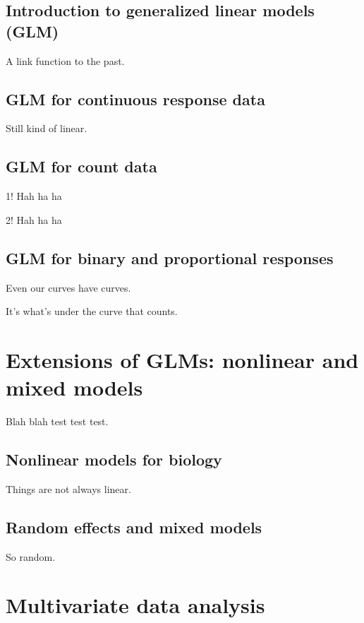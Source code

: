 \documentclass[
  13,
  letterpaper,
]{report}
\begin{document}
\chapter{Introduction to generalized linear models (GLM)}\label{sec-16}

A link function to the past.

\chapter{GLM for continuous response data}\label{sec-17}

Still kind of linear.

\chapter{GLM for count data}\label{sec-18}

1! Hah ha ha

2! Hah ha ha

\chapter{GLM for binary and proportional responses}\label{sec-19}

Even our curves have curves.

It's what's under the curve that counts.

\part{Extensions of GLMs: nonlinear and mixed models}

Blah blah test test test.

\chapter{Nonlinear models for biology}\label{sec-20}

Things are not always linear.

\chapter{Random effects and mixed models}\label{sec-21}

So random.

\part{Multivariate data analysis}
\end{document}
